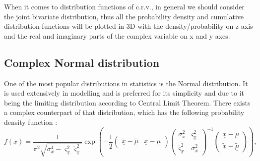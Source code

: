 \documentclass[
]{book}
\begin{document}
When it comes to distribution functions of c.r.v., in general we should consider the joint bivariate distribution, thus all the probability density and cumulative distribution functions will be plotted in 3D with the density/probability on z-axis and the real and imaginary parts of the complex variable on x and y axes.

\hypertarget{distributionCNorm}{%
\subsection{Complex Normal distribution}\label{distributionCNorm}}

One of the most popular distributions in statistics is the Normal distribution. It is used extensively in modelling and is preferred for its simplicity and due to it being the limiting distribution according to Central Limit Theorem. There exists a complex counterpart of that distribution, which has the following probability density function \citep{Wooding1956a}:
\begin{equation}
    f(\underline{x}) = \frac{1}{\pi^2 \sqrt{\sigma_{\underline{x}}^4 - \varsigma_{\underline{x}}^2 \tilde{\varsigma}_{\underline{x}}^2}} \exp\left(- \frac{1}{2}
        \begin{pmatrix} \underline{\tilde{x}} - \underline{\tilde{\mu}} & \underline{x} - \underline{\mu} \end{pmatrix}
        \begin{pmatrix} \sigma_{\underline{x}}^2 & \varsigma_{\underline{x}}^2 \\ \tilde{\varsigma}_{\underline{x}}^2 & \sigma_{\underline{x}}^2 \end{pmatrix}^{-1}
        \begin{pmatrix} \underline{x} - \underline{\mu} \\ \underline{\tilde{x}} - \underline{\tilde{\mu}} \end{pmatrix}
    \right),
    \label{eq:ComplexNormalPDF}
\end{equation}
\end{document}
